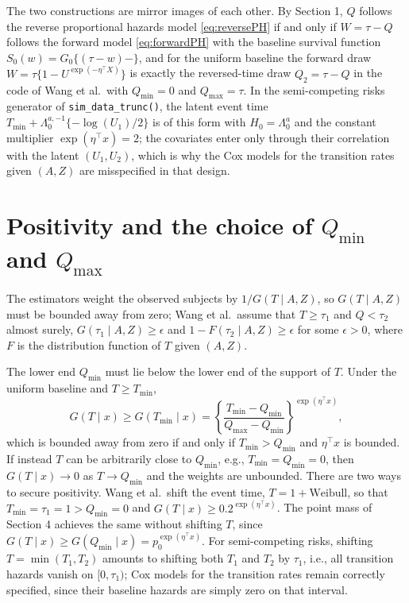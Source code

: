 \documentclass[11pt]{article}
\newcommand{\Qmin}{Q_{\min}}
\newcommand{\Qmax}{Q_{\max}}
\begin{document}
The two constructions are mirror images of each other. By Section 1, $Q$ follows the
reverse proportional hazards model \eqref{eq:reversePH} if and only if $W = \tau - Q$
follows the forward model \eqref{eq:forwardPH} with the baseline survival function
$S_0(w) = G_0\{(\tau - w)-\}$, and for the uniform baseline the forward draw
$W = \tau\{1 - U^{\exp(-\eta^\top X)}\}$ is exactly the reversed-time draw
$Q_2 = \tau - Q$ in the code of Wang et al.\ with $\Qmin = 0$ and $\Qmax = \tau$. In the
semi-competing risks generator of \texttt{sim\_data\_trunc()}, the latent event time
$T_{\min} + \Lambda_0^{a,-1}\{-\log(U_1)/2\}$ is of this form with $H_0 = \Lambda_0^a$ and the
constant multiplier $\exp(\eta^\top x) = 2$; the covariates enter only through their
correlation with the latent $(U_1, U_2)$, which is why the Cox models for the transition
rates given $(A, Z)$ are misspecified in that design.

\section{Positivity and the choice of \texorpdfstring{$\Qmin$}{Q\_min} and \texorpdfstring{$\Qmax$}{Q\_max}}

The estimators weight the observed subjects by $1/G(T \mid A, Z)$, so $G(T \mid A, Z)$ must
be bounded away from zero; Wang et al.\ assume that $T \ge \tau_1$ and $Q < \tau_2$ almost
surely, $G(\tau_1 \mid A, Z) \ge \epsilon$ and $1 - F(\tau_2 \mid A, Z) \ge \epsilon$ for
some $\epsilon > 0$, where $F$ is the distribution function of $T$ given $(A, Z)$.

The lower end $\Qmin$ must lie below the lower end of the support of $T$. Under the
uniform baseline and $T \ge T_{\min}$,
\begin{equation*}
G(T \mid x) \ge G(T_{\min} \mid x)
= \left\{\frac{T_{\min} - \Qmin}{\Qmax - \Qmin}\right\}^{\exp(\eta^\top x)},
\end{equation*}
which is bounded away from zero if and only if $T_{\min} > \Qmin$ and $\eta^\top x$ is
bounded. If instead $T$ can be arbitrarily close to $\Qmin$, e.g., $T_{\min} = \Qmin = 0$,
then $G(T \mid x) \to 0$ as $T \to \Qmin$ and the weights are unbounded. There are two ways
to secure positivity. Wang et al.\ shift the event time, $T = 1 + \text{Weibull}$, so that
$T_{\min} = \tau_1 = 1 > \Qmin = 0$ and $G(T \mid x) \ge 0.2^{\exp(\eta^\top x)}$. The
point mass of Section 4 achieves the same without shifting $T$, since
$G(T \mid x) \ge G(\Qmin \mid x) = p_0^{\exp(\eta^\top x)}$. For semi-competing risks,
shifting $T = \min(T_1, T_2)$ amounts to shifting both $T_1$ and $T_2$ by $\tau_1$, i.e.,
all transition hazards vanish on $[0, \tau_1)$; Cox models for the transition rates remain
correctly specified, since their baseline hazards are simply zero on that interval.
\end{document}
